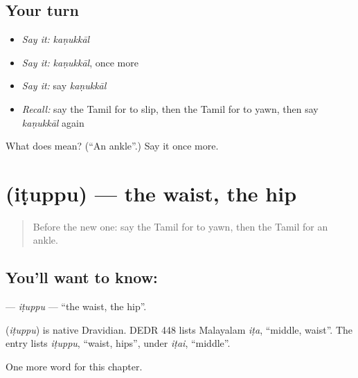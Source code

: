 \subsection*{Your turn}
\begin{itemize}
\raggedright
  \item \emph{Say it:} \emph{kaṇukkāl}
  \item \emph{Say it:} \emph{kaṇukkāl}, once more
  \item \emph{Say it:} say \emph{kaṇukkāl}
  \item \emph{Recall:} say the Tamil for to slip, then the Tamil for to yawn, then say \emph{kaṇukkāl} again
\end{itemize}

\begin{tcolorbox}[breakable,colback=teal!4,colframe=teal!35!black,title={Before you move on}]
What does  mean? (\textquotedblleft{}An ankle\textquotedblright{}.) Say it once more.
\end{tcolorbox}
\section[\texorpdfstring{\ta{இடுப்பு} (iṭuppu)}{இடுப்பு (iṭuppu)}]{ (iṭuppu) — the waist, the hip}

\label{lesson:TA-C169-ituppu}



\begin{quote}
Before the new one: say the Tamil for to yawn, then the Tamil for an ankle.
\end{quote}

\subsection*{You'll want to know: }
\textbf{} — \emph{iṭuppu} — \textquotedblleft{}the waist, the hip\textquotedblright{}.

\begin{cousinweb}
\textbf{} (\emph{iṭuppu}) is native Dravidian. DEDR 448 lists Malayalam \emph{iṭa}, \textquotedblleft{}middle, waist\textquotedblright{}. The entry lists \emph{iṭuppu}, \textquotedblleft{}waist, hips\textquotedblright{}, under \emph{iṭai}, \textquotedblleft{}middle\textquotedblright{}.
\end{cousinweb}

\begin{grammarlens}[title={What you've built}]
One more word for this chapter.
\end{grammarlens}

